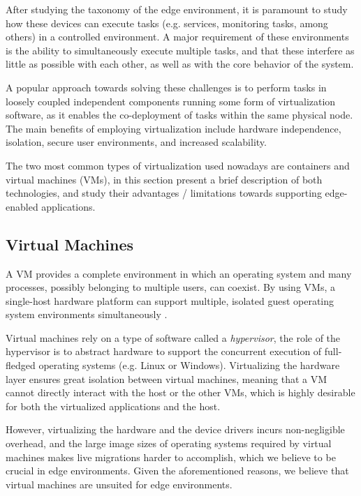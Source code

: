 
After studying the taxonomy of the edge environment, it is paramount to study how these devices can execute tasks (e.g. services, monitoring tasks, among others) in a controlled environment. A major requirement of these environments is the ability to simultaneously execute multiple tasks, and that these interfere as little as possible with each other, as well as with the core behavior of the system.

A popular approach towards solving these challenges is to perform tasks in loosely coupled independent components running some form of virtualization software, as it enables the co-deployment of tasks within the same physical node. The main benefits of employing virtualization include hardware independence, isolation, secure user environments, and increased scalability. 

The two most common types of virtualization used nowadays are containers and virtual machines (VMs), in this section present a brief description of both technologies, and study their advantages / limitations towards supporting edge-enabled applications.

\subsection{Virtual Machines}

A VM provides a complete environment in which an operating system and many processes, possibly belonging to multiple users, can coexist. By using VMs, a single-host hardware platform can support multiple, isolated guest operating system environments simultaneously \cite{1430629}. 

Virtual machines rely on a type of software called a \textit{hypervisor}, the role of the hypervisor is to abstract hardware to support the concurrent execution of full-fledged operating systems (e.g. Linux or Windows). Virtualizing the hardware layer ensures great isolation between virtual machines, meaning that a VM cannot directly interact with the host or the other VMs, which is highly desirable for both the virtualized applications and the host. 

However, virtualizing the hardware and the device drivers incurs non-negligible overhead, and the large image sizes of operating systems required by virtual machines makes live migrations harder to accomplish, which we believe to be crucial in edge environments. Given the aforementioned reasons, we believe that virtual machines are unsuited for edge environments.

